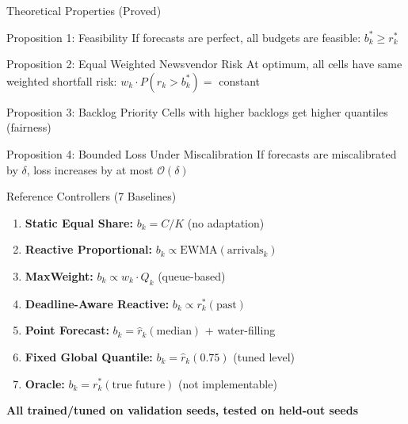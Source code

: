 \documentclass[aspectratio=169]{beamer}
\begin{document}
\begin{frame}{Theoretical Properties (Proved)}
\begin{block}{Proposition 1: Feasibility}
If forecasts are perfect, all budgets are feasible: $b_k^* \geq r_k^*$
\end{block}

\begin{block}{Proposition 2: Equal Weighted Newsvendor Risk}
At optimum, all cells have same weighted shortfall risk: $w_k \cdot P(r_k > b_k^*) = $ constant
\end{block}

\begin{block}{Proposition 3: Backlog Priority}
Cells with higher backlogs get higher quantiles (fairness)
\end{block}

\begin{block}{Proposition 4: Bounded Loss Under Miscalibration}
If forecasts are miscalibrated by $\delta$, loss increases by at most $\mathcal{O}(\delta)$
\end{block}
\end{frame}

\begin{frame}{Reference Controllers (7 Baselines)}
\begin{enumerate}
    \item \textbf{Static Equal Share:} $b_k = C/K$ (no adaptation)
    
    \item \textbf{Reactive Proportional:} $b_k \propto \text{EWMA}(\text{arrivals}_k)$
    
    \item \textbf{MaxWeight:} $b_k \propto w_k \cdot Q_k$ (queue-based)
    
    \item \textbf{Deadline-Aware Reactive:} $b_k \propto r_k^*(\text{past})$
    
    \item \textbf{Point Forecast:} $b_k = \hat{r}_k(\text{median})$ + water-filling
    
    \item \textbf{Fixed Global Quantile:} $b_k = \hat{r}_k(0.75)$ (tuned level)
    
    \item \textbf{Oracle:} $b_k = r_k^*(\text{true future})$ (not implementable)
\end{enumerate}

\vspace{0.3cm}
\textbf{All trained/tuned on validation seeds, tested on held-out seeds}
\end{frame}
\end{document}
